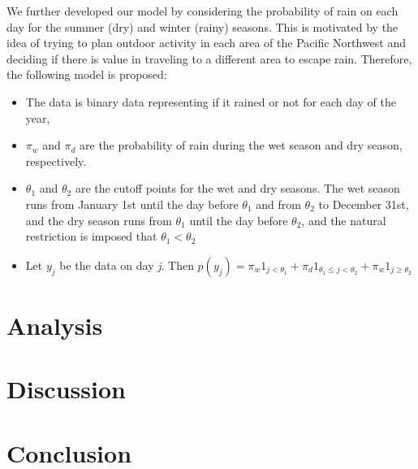 \documentclass{article}
\begin{document}
We further developed our model by considering the probability of rain on each day for the summer (dry) and winter (rainy) seasons. This is motivated by the idea of trying to plan outdoor activity in each area of the Pacific Northwest and deciding if there is value in traveling to a different area to escape rain.
Therefore, the following model is proposed:
\begin{itemize}
\item The data is binary data representing if it rained or not for each day of the year,
\item $\pi_w$ and $\pi_d$ are the probability of rain during the wet season and dry season, respectively.
\item $\theta_1$ and $\theta_2$ are the cutoff points for the wet and dry seasons. The wet season runs from January 1st until the day before $\theta_1$ and from $\theta_2$ to December 31st, and the dry season runs from $\theta_1$ until the day before $\theta_2$, and the natural restriction is imposed that $\theta_1 < \theta_2$
\item Let $y_j$ be the data on day \textit{j}. Then $p(y_j) = \pi_w  1_{j < \theta_1} + \pi_d  1_{\theta_1\leq j < \theta_2} +\pi_w  1_{j \geq \theta_2} $
\end{itemize}

\section{Analysis}

\section{Discussion}

\section{Conclusion}
\end{document}

